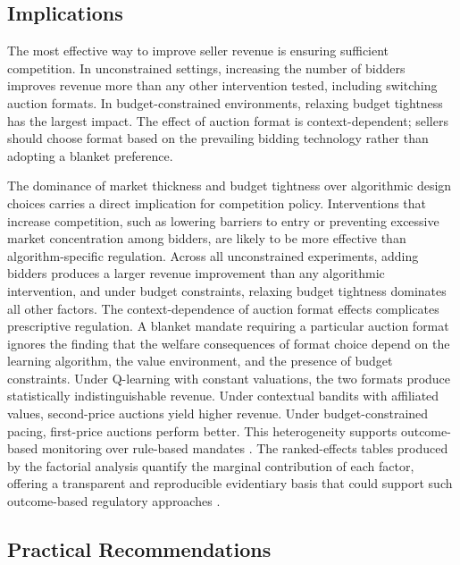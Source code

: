 \subsection{Implications}

The most effective way to improve seller revenue is ensuring sufficient competition. In unconstrained settings, increasing the number of bidders improves revenue more than any other intervention tested, including switching auction formats. In budget-constrained environments, relaxing budget tightness has the largest impact. The effect of auction format is context-dependent; sellers should choose format based on the prevailing bidding technology rather than adopting a blanket preference.

The dominance of market thickness and budget tightness over algorithmic design choices carries a direct implication for competition policy. Interventions that increase competition, such as lowering barriers to entry or preventing excessive market concentration among bidders, are likely to be more effective than algorithm-specific regulation. Across all unconstrained experiments, adding bidders produces a larger revenue improvement than any algorithmic intervention, and under budget constraints, relaxing budget tightness dominates all other factors. The context-dependence of auction format effects complicates prescriptive regulation. A blanket mandate requiring a particular auction format ignores the finding that the welfare consequences of format choice depend on the learning algorithm, the value environment, and the presence of budget constraints. Under Q-learning with constant valuations, the two formats produce statistically indistinguishable revenue. Under contextual bandits with affiliated values, second-price auctions yield higher revenue. Under budget-constrained pacing, first-price auctions perform better. This heterogeneity supports outcome-based monitoring over rule-based mandates \citep{OECD2023, Johnson2023}. The ranked-effects tables produced by the factorial analysis quantify the marginal contribution of each factor, offering a transparent and reproducible evidentiary basis that could support such outcome-based regulatory approaches \citep{Harrington2018, Gal2019}.

\subsection{Practical Recommendations}
\label{sec:practitioners_guide}

